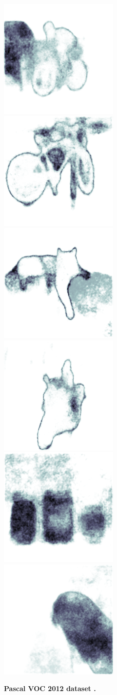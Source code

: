 \begin{figure}[p]
\begin{center}
{\includegraphics[height=0.125\linewidth]{BayesianSegNet/segnet_bayes_00202_uncertainty.png}
\includegraphics[height=0.125\linewidth]{BayesianSegNet/segnet_bayes_00147_uncertainty.png}
\includegraphics[height=0.125\linewidth]{BayesianSegNet/segnet_bayes_00148_uncertainty.png}
\includegraphics[height=0.125\linewidth]{BayesianSegNet/segnet_bayes_00166_uncertainty.png}
\includegraphics[height=0.125\linewidth]{BayesianSegNet/segnet_bayes_00017_uncertainty.png}
\includegraphics[height=0.125\linewidth]{BayesianSegNet/segnet_bayes_00023_uncertainty.png}
}
\end{center}
\label{fig:qual_pascal}
\caption[Bayesian SegNet results on the Pascal VOC dataset.]{\footnotesize \textbf{Pascal VOC 2012 dataset \citep{pascal}.}}
\end{figure}

